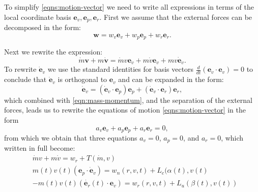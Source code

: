 \documentclass{article}
\renewcommand{\vec}[1]{\boldsymbol{#1}}
\begin{document}
To simplify \eqref{eqns:motion-vector} we need to write all expressions in terms of the local coordinate basis $\vec e_v, \vec e_p, \vec e_r$. First we assume that the external forces can be decomposed in the form:
\[
\vec w = w_v \vec e_v + w_p \vec e_p + w_r \vec e_r.
\]

Next we rewrite the expression:
\begin{equation} \label{eqn:mass-momentum}
    \dot{m}\vec{v} + m \dot{\vec{v}} = \dot{m}v \vec{e}_v + m \dot v \vec{e}_v + m v \dot{\vec{e}}_v.
\end{equation}
To rewrite $\dot{\vec{e}}_v$ we use the standard identities for basis vectors $\frac{d}{dt}(\vec{e}_v \cdot \vec{e}_v)=0$
to conclude that $\dot{\vec{e}}_v$ is orthogonal to ${\vec{e}}_v$ and can be expanded in the form:
\[
\dot{\vec{e}}_v =  (\dot{\vec{e}}_v \cdot \vec{e}_p)\vec{e}_p + (\dot{\vec{e}}_v \cdot \vec{e}_r)\vec{e}_r,
\] 
which combined with \eqref{eqn:mass-momentum}, and the separation of the external forces, leads us to rewrite the equations of motion \eqref{eqns:motion-vector} in the form 
\[ 
a_v \vec e_v + a_p \vec e_p + a_r \vec e_r = 0,
\]
from which we obtain that three equations $a_v =0$, $a_p =0$, and $a_r =0$, which written in full become:
\begin{align} \label{eqn:thrust-momentum}
    &  \dot{m} v + m \dot v = w_r + T(\dot{m},v) 
    \\
    \label{eqn:turn-momentum}
    &  m(t) v(t)({\vec{e}}_p \cdot \dot{\vec{e}}_v) = w_n(r,v,t) + L_c(\alpha(t),v(t)
    \\
    \label{eqn:lift-momentum}
    & -m(t) v(t)(\dot{\vec{e}_r}(t) \cdot \vec{e}_v)=w_r(r,v,t)+L_u(\beta(t),v(t))
\end{align}
\end{document}

